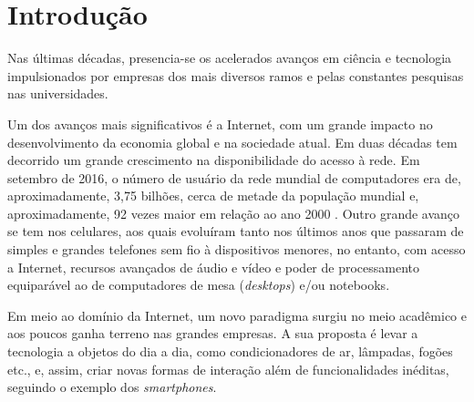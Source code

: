 \chapter{Introdução}









Nas últimas décadas, presencia-se os acelerados avanços em ciência e tecnologia impulsionados por empresas dos mais diversos ramos e pelas constantes pesquisas nas universidades. 

Um dos avanços mais significativos é a Internet, com um grande impacto no desenvolvimento da economia global e na sociedade atual. Em duas décadas tem decorrido um grande crescimento na disponibilidade do acesso à rede. Em setembro de 2016, o número de usuário da rede mundial de computadores era de, aproximadamente, 3,75 bilhões, cerca de metade da população mundial e, aproximadamente, 92 vezes maior em relação ao ano 2000 \cite{Stats2017}.  Outro grande avanço se tem nos celulares, aos quais evoluíram tanto nos últimos anos que passaram de simples e grandes telefones sem fio à dispositivos menores, no entanto, com acesso a Internet, recursos avançados de áudio e vídeo e poder de processamento equiparável ao de computadores de mesa (\textit{desktops}) e/ou notebooks.

Em meio ao domínio da Internet, um novo paradigma surgiu no meio acadêmico e aos poucos ganha terreno nas grandes empresas. A sua proposta é levar a tecnologia a objetos do dia a dia, como condicionadores de ar, lâmpadas, fogões etc., e, assim, criar novas formas de interação além de funcionalidades inéditas, seguindo o exemplo dos \textit{smartphones}. 

